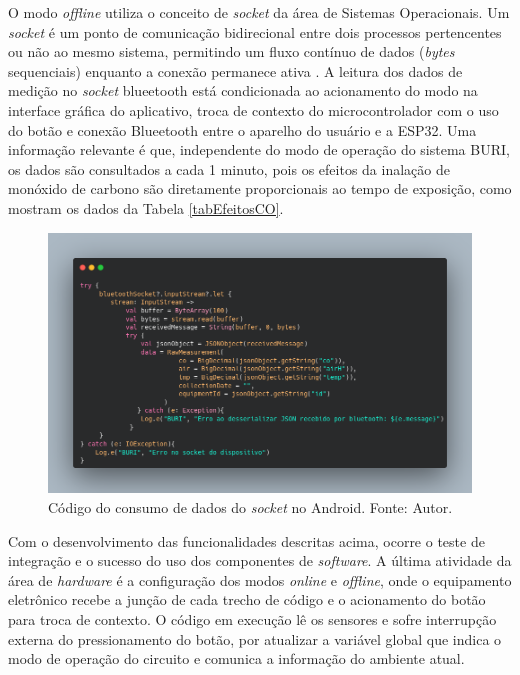 O modo \textit{offline} utiliza o conceito de \textit{socket} da área de Sistemas Operacionais. Um \textit{socket} é um ponto de comunicação 
bidirecional entre dois processos pertencentes ou não ao mesmo sistema, permitindo um fluxo contínuo de dados (\textit{bytes} sequenciais) enquanto 
a conexão permanece ativa \cite{socket-geeksforgeeks}. A leitura dos dados de medição no \textit{socket} blueetooth está condicionada 
ao acionamento do modo na interface gráfica do aplicativo, troca de contexto do microcontrolador com o uso do botão e conexão Blueetooth entre o aparelho 
do usuário e a ESP32. Uma informação relevante é que, independente do modo de operação do sistema BURI, os dados são consultados a cada 1 minuto, pois 
os efeitos da inalação de monóxido de carbono são diretamente proporcionais ao tempo de exposição, como mostram os dados da Tabela \ref{tabEfeitosCO}. 

\begin{figure}[ht]
    \centering
    \includegraphics[width=.64\textwidth]{img/buri-android-socket.png}
    \caption{Código do consumo de dados do \textit{socket} no Android. Fonte: Autor.}\label{figBlueetoothSocketAndroid}
\end{figure}

Com o desenvolvimento das funcionalidades descritas acima, ocorre o teste de integração e o sucesso do uso dos componentes de \textit{software}. A última atividade da área de \textit{hardware} é a configuração dos modos 
\textit{online} e \textit{offline}, onde o equipamento eletrônico recebe a junção de cada trecho de código e o acionamento do botão para troca de contexto. O 
código em execução lê os sensores e sofre interrupção externa do pressionamento do botão, por atualizar a variável global que indica o modo de operação do circuito e
comunica a informação do ambiente atual. 

